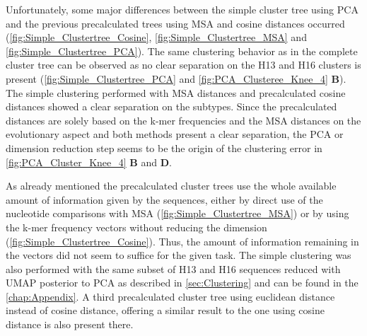 Unfortunately, some major differences between the simple cluster tree using \gls{PCA} and the previous precalculated trees using \gls{MSA} and cosine distances occurred (\autoref{fig:Simple_Clustertree_Cosine}, \autoref{fig:Simple_Clustertree_MSA} and \autoref{fig:Simple_Clustertree_PCA}). The same clustering behavior as in the complete cluster tree can be observed as no clear separation on the H13 and H16 clusters is present (\autoref{fig:Simple_Clustertree_PCA} and \autoref{fig:PCA_Clusteree_Knee_4} \textbf{\textsf{B}}). The simple clustering performed with \gls{MSA} distances and precalculated cosine distances showed a clear separation on the subtypes. Since the precalculated distances are solely based on the k-mer frequencies and the \gls{MSA} distances on the evolutionary aspect and both methods present a clear separation, the \gls{PCA} or dimension reduction step seems to be the origin of the clustering error in \autoref{fig:PCA_Cluster_Knee_4} \textbf{\textsf{B}} and \textbf{\textsf{D}}. 

As already mentioned the precalculated cluster trees use the whole available amount of information given by the sequences, either by direct use of the nucleotide comparisons with \gls{MSA} (\autoref{fig:Simple_Clustertree_MSA}) or by using the k-mer frequency vectors without reducing the dimension (\autoref{fig:Simple_Clustertree_Cosine}). Thus, the amount of information remaining in the vectors did not seem to suffice for the given task. The simple clustering was also performed with the same subset of H13 and H16 sequences reduced with \gls{UMAP} posterior to \gls{PCA} as described in \autoref{sec:Clustering} and can be found in the \autoref{chap:Appendix}. A third precalculated cluster tree using euclidean distance instead of cosine distance, offering a similar result to the one using cosine distance is also present there.